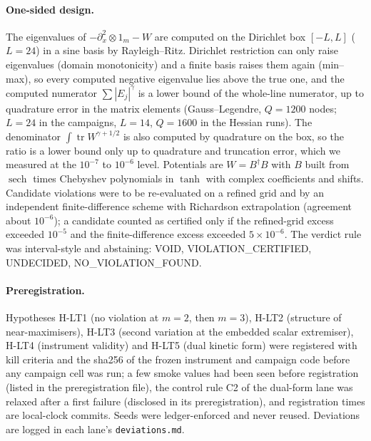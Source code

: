 \documentclass[11pt]{article}
\theoremstyle{remark}
\DeclareMathOperator{\tr}{tr}
\begin{document}
\paragraph{One-sided design.} The eigenvalues of $-\partial_x^2\otimes 1_m-W$ are computed on the Dirichlet box $[-L,L]$ ($L=24$) in a sine basis by Rayleigh--Ritz.
Dirichlet restriction can only raise eigenvalues (domain monotonicity) and a finite basis raises them again (min--max), so every computed negative eigenvalue lies above the true one, and the computed numerator $\sum|E_j|^\gamma$ is a lower bound of the whole-line numerator, up to quadrature error in the matrix elements
(Gauss--Legendre, $Q=1200$ nodes; $L=24$ in the campaigns, $L=14$, $Q=1600$ in the Hessian runs). The denominator $\int\tr W^{\gamma+1/2}$ is also computed by quadrature on the box, so the ratio is a lower bound only up to
quadrature and truncation error, which we measured at the $10^{-7}$ to $10^{-6}$ level. Potentials are $W=B^\dagger B$ with $B$ built from $\operatorname{sech}$ times Chebyshev polynomials in $\tanh$ with complex coefficients and shifts.
Candidate violations were to be re-evaluated on a refined grid and by an independent finite-difference scheme with Richardson extrapolation (agreement about $10^{-6}$); a candidate counted as certified only if the refined-grid excess exceeded $10^{-5}$ and the finite-difference excess exceeded $5\times10^{-6}$.
The verdict rule was interval-style and abstaining: VOID, VIOLATION\_CERTIFIED, UNDECIDED, NO\_VIOLATION\_FOUND.

\paragraph{Preregistration.} Hypotheses H-LT1 (no violation at $m=2$, then $m=3$), H-LT2 (structure of near-maximisers), H-LT3 (second variation at the embedded scalar extremiser), H-LT4 (instrument validity)
and H-LT5 (dual kinetic form) were registered with kill criteria and the sha256 of the frozen instrument and campaign code before any campaign cell was run; a few smoke values had been seen before registration (listed in the preregistration file),
the control rule C2 of the dual-form lane was relaxed after a first failure (disclosed in its preregistration), and registration times are local-clock commits. Seeds were ledger-enforced and never reused. Deviations are logged in each lane's \texttt{deviations.md}.
\end{document}
